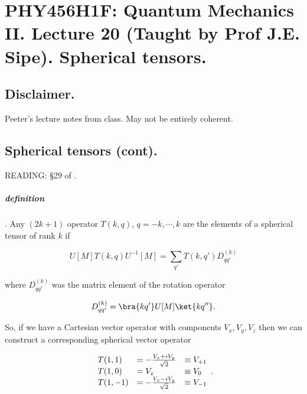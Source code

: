 
%

\chapter{PHY456H1F: Quantum Mechanics II.  Lecture 20 (Taught by Prof J.E. Sipe).  Spherical tensors.}
\label{chap:qmTwoL20}
{}
\date{Nov 21, 2011}

\beginArtWithToc

\section{Disclaimer.}

Peeter's lecture notes from class.  May not be entirely coherent.

\section{Spherical tensors (cont).}

READING: \S 29 of \cite{desai2009quantum}.

\paragraph{definition}.  Any $(2k + 1)$ operator $T(k, q)$, $q = -k, \cdots, k$ are the elements of a spherical tensor of rank $k$ if

\begin{equation}\label{eqn:qmTwoL20:10}
U[M] T(k, q) U^{-1}[M]
= \sum_{q'} T(k, q') D^{(k)}_{q q'}
\end{equation}

where $D^{(k)}_{q q'}$ was the matrix element of the rotation operator

\begin{equation}\label{eqn:qmTwoL20:20}
D^{(k)}_{q q'} = \bra{k q'} U[M] \ket{k q''}.
\end{equation}

So, if we have a Cartesian vector operator with components $V_x, V_y, V_z$ then we can construct a corresponding spherical vector operator

\begin{equation}\label{eqn:qmTwoL20:30}
\begin{array}{l l l}
T(1, 1) &= - \frac{V_x + i V_y}{\sqrt{2}} &\equiv V_{+1} \\
T(1, 0) &= V_z &\equiv V_0 \\
T(1, -1) &= - \frac{V_x - i V_y}{\sqrt{2}} &\equiv V_{-1}
\end{array}.
\end{equation}

